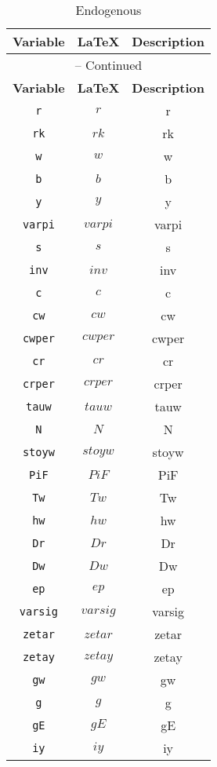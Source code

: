 \begin{center}
\begin{longtable}{ccc}
\caption{Endogenous}\\%
\hline%
\multicolumn{1}{c}{\textbf{Variable}} &
\multicolumn{1}{c}{\textbf{\LaTeX}} &
\multicolumn{1}{c}{\textbf{Description}}\\%
\hline\hline%
\endfirsthead
\multicolumn{3}{c}{{\tablename} \thetable{} -- Continued}\\%
\hline%
\multicolumn{1}{c}{\textbf{Variable}} &
\multicolumn{1}{c}{\textbf{\LaTeX}} &
\multicolumn{1}{c}{\textbf{Description}}\\%
\hline\hline%
\endhead
\texttt{r} & $r$ & r\\
\texttt{rk} & $rk$ & rk\\
\texttt{w} & $w$ & w\\
\texttt{b} & $b$ & b\\
\texttt{y} & $y$ & y\\
\texttt{varpi} & $varpi$ & varpi\\
\texttt{s} & $s$ & s\\
\texttt{inv} & $inv$ & inv\\
\texttt{c} & $c$ & c\\
\texttt{cw} & $cw$ & cw\\
\texttt{cwper} & $cwper$ & cwper\\
\texttt{cr} & $cr$ & cr\\
\texttt{crper} & $crper$ & crper\\
\texttt{tauw} & $tauw$ & tauw\\
\texttt{N} & $N$ & N\\
\texttt{stoyw} & $stoyw$ & stoyw\\
\texttt{PiF} & $PiF$ & PiF\\
\texttt{Tw} & $Tw$ & Tw\\
\texttt{hw} & $hw$ & hw\\
\texttt{Dr} & $Dr$ & Dr\\
\texttt{Dw} & $Dw$ & Dw\\
\texttt{ep} & $ep$ & ep\\
\texttt{varsig} & $varsig$ & varsig\\
\texttt{zetar} & $zetar$ & zetar\\
\texttt{zetay} & $zetay$ & zetay\\
\texttt{gw} & $gw$ & gw\\
\texttt{g} & $g$ & g\\
\texttt{gE} & $gE$ & gE\\
\texttt{iy} & $iy$ & iy\\

\end{longtable}
\end{center}
